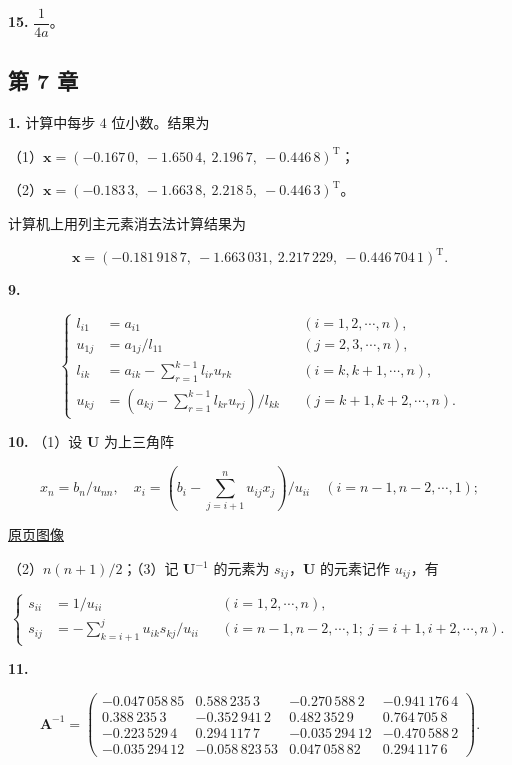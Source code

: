 \documentclass[
  10pt,
  fontset=fandol]{ctexart}
\begin{document}
\textbf{15.} \(\dfrac{1}{4a}\)。

\subsection{第 7 章}\label{ux7b2c-7-ux7ae0}

\textbf{1.} 计算中每步 \(4\) 位小数。结果为

（1）\(\boldsymbol{x}=(-0.167\,0,\allowbreak \ -1.650\,4,\allowbreak \ 2.196\,7,\allowbreak \ -0.446\,8)^{\mathrm{T}}\)；

（2）\(\boldsymbol{x}=(-0.183\,3,\allowbreak \ -1.663\,8,\allowbreak \ 2.218\,5,\allowbreak \ -0.446\,3)^{\mathrm{T}}\)。

计算机上用列主元素消去法计算结果为

\[
\boldsymbol{x}=(-0.181\,918\,7,\ -1.663\,031,\ 2.217\,229,\ -0.446\,704\,1)^{\mathrm{T}}.
\]

\textbf{9.}

\[
\left\{
\begin{aligned}
l_{i1}&=a_{i1} &&(i=1,2,\cdots,n),\\
u_{1j}&=a_{1j}/l_{11} &&(j=2,3,\cdots,n),\\
l_{ik}&=a_{ik}-\sum_{r=1}^{k-1}l_{ir}u_{rk} &&(i=k,k+1,\cdots,n),\\
u_{kj}&=\left(a_{kj}-\sum_{r=1}^{k-1}l_{kr}u_{rj}\right)/l_{kk} &&(j=k+1,k+2,\cdots,n).
\end{aligned}
\right.
\]

\textbf{10.} （1）设 \(\boldsymbol{U}\) 为上三角阵

\[
x_n=b_n/u_{nn},\quad
x_i=\left(b_i-\sum_{j=i+1}^{n}u_{ij}x_j\right)/u_{ii}
\quad(i=n-1,n-2,\cdots,1);
\]

\href{../../source-images/pdf-320.jpeg}{原页图像}

（2）\(n(n+1)/2\)；（3）记 \(\boldsymbol{U}^{-1}\) 的元素为 \(s_{ij}\)，\(\boldsymbol{U}\) 的元素记作 \(u_{ij}\)，有

\[
\left\{
\begin{aligned}
s_{ii}&=1/u_{ii} &&(i=1,2,\cdots,n),\\
s_{ij}&=-\sum_{k=i+1}^{j}u_{ik}s_{kj}/u_{ii}
&&(i=n-1,n-2,\cdots,1;\ j=i+1,i+2,\cdots,n).
\end{aligned}
\right.
\]

\textbf{11.}

\[
\boldsymbol{A}^{-1}=
\begin{pmatrix}
-0.047\,058\,85 & 0.588\,235\,3 & -0.270\,588\,2 & -0.941\,176\,4\\
0.388\,235\,3 & -0.352\,941\,2 & 0.482\,352\,9 & 0.764\,705\,8\\
-0.223\,529\,4 & 0.294\,117\,7 & -0.035\,294\,12 & -0.470\,588\,2\\
-0.035\,294\,12 & -0.058\,823\,53 & 0.047\,058\,82 & 0.294\,117\,6
\end{pmatrix}.
\]
\end{document}
